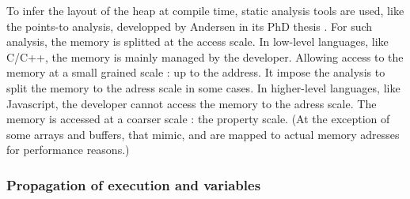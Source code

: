 

To infer the layout of the heap at compile time, static analysis tools are used, like the points-to analysis, developped by Andersen in its PhD thesis \cite{Andersen1994}.
For such analysis, the memory is splitted at the access scale.
In low-level languages, like C/C++, the memory is mainly managed by the developer. Allowing access to the memory at a small grained scale : up to the address.
It impose the analysis to split the memory to the adress scale in some cases.
In higher-level languages, like Javascript, the developer cannot access the memory to the adress scale.
The memory is accessed at a coarser scale : the property scale.
(At the exception of some arrays and buffers, that mimic, and are mapped to actual memory adresses for performance reasons.)

\subsubsection{Propagation of execution and variables}



